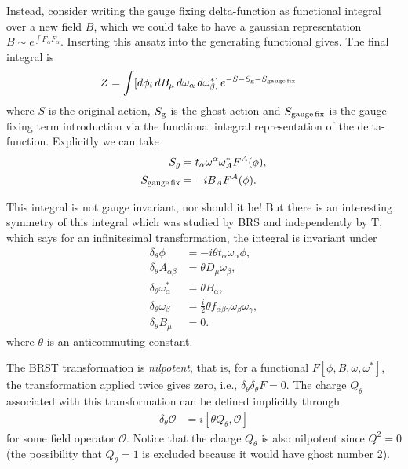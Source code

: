 \documentclass[notitlepage,amsmath,amssymb,aps, pra, 10pt]{revtex4-1}
\begin{document}
    Instead, consider writing the gauge fixing delta-function as functional integral over a new field $B$, which we could take to have a gaussian representation $B \sim e^{\int F_{\alpha}F_{\alpha}}$. Inserting this ansatz into the generating functional gives. The final integral is
        \begin{align}
        Z &= \int [d \phi_i\, dB_{\mu} \, d\omega_{\alpha} \,d\omega_{\beta}^*]\, e^{-S  -S_{\rm g} - S_{\rm gauge\,fix}}
    \end{align}
    where $S$ is the original action, $S_{\rm g}$ is the ghost action and $S_{\rm gauge\,fix}$ is the gauge fixing term introduction via the functional integral representation of the delta-function. Explicitly we can take
    \begin{align}
        S_{g} &= t_{\alpha} {\omega}^{\alpha}  \omega_A^* F^{A}(\phi),\\
        S_{\rm gauge\,fix} &=-i B_A F^{A}(\phi).
    \end{align}

    This integral is not gauge invariant, nor should it be! But there is an interesting symmetry of this integral which was studied by BRS and independently by T, which says for an infinitesimal transformation, the integral is invariant under
    \begin{align}
        \delta_{\theta} \phi &= -i \theta t_{\alpha} \omega_{\alpha} \phi,\\
        \delta_{\theta} A_{\alpha \beta} &= \theta D_{\mu} \omega_{\beta},\\
        \delta_{\theta} \omega_{\alpha}^* &= \theta B_{\alpha},\\
        \delta_{\theta} \omega_{\beta} &= \frac{i}{2} \theta f_{\alpha\beta\gamma}\omega_{\beta}\omega_{\gamma},\\
        \delta_{\theta} B_{\mu}  &= 0.
    \end{align}
    where $\theta$ is an anticommuting constant.

    The BRST transformation is \emph{nilpotent}, that is, for a functional $F[\phi, B, \omega, \omega^*]$, the transformation applied twice gives zero, i.e., $\delta_{\theta}\delta_{\theta} F = 0$. The charge $Q_{\theta}$ associated with this transformation can be defined implicitly through
    \begin{align}
        \delta_{\theta} \mathcal{O} & = i [\theta Q_{\theta}, \mathcal{O}]
    \end{align}
    for some field operator $\mathcal{O}$. Notice that the charge $Q_{\theta}$ is also nilpotent since $Q^2 = 0$ (the possibility that $Q_{\theta} = 1$ is excluded because it would have ghost number 2).
\end{document}
